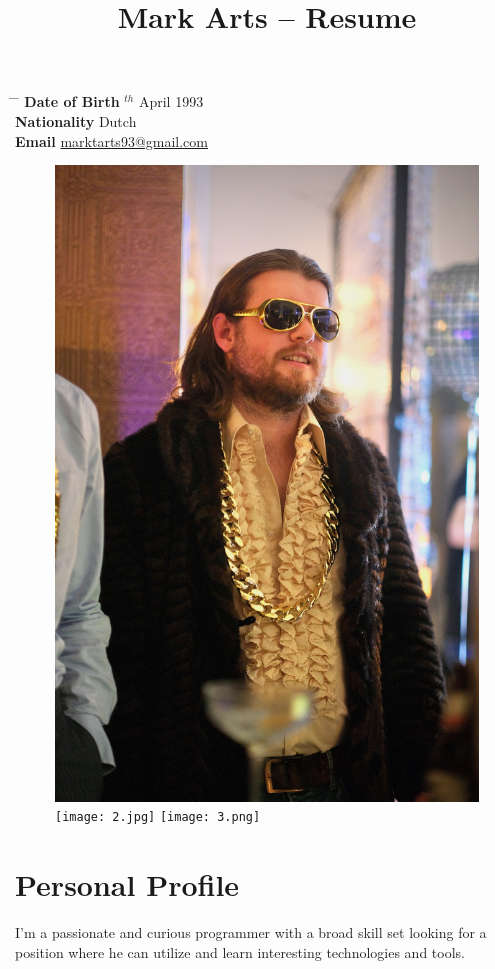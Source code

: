 \documentclass[10pt]{article} %
\begin{document}

\title{Mark Arts -- Resume} %


\parbox{0.5\textwidth}{ %
\begin{tabbing} %
\hspace{3cm} \= \hspace{4cm} \= \kill %
{\bf Date of Birth} $^{th}$ April 1993 \\ %
{\bf Nationality} \> Dutch \\%
{\bf Email} \> \href{mailto:marktarts93@gmail.com}{marktarts93@gmail.com} \\ %
\end{tabbing}}


\begin{figure}[ht]
  \includegraphics[width=0.33\linewidth]{1.jpg}
  \texttt{[image: 2.jpg]}
  \texttt{[image: 3.png]}
\end{figure}

\section{Personal Profile}

I'm a passionate and curious programmer with a broad skill set looking for a position where he can utilize and learn interesting technologies and tools. \\
\end{document}
